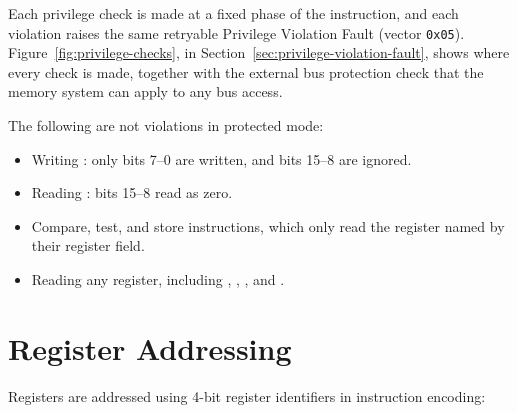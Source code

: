 Each privilege check is made at a fixed phase of the instruction, and each violation raises the same retryable
Privilege Violation Fault (vector \texttt{0x05}). Figure~\ref{fig:privilege-checks}, in
Section~\ref{sec:privilege-violation-fault}, shows where every check is made, together with the external bus protection
check that the memory system can apply to any bus access.

The following are not violations in protected mode:
\begin{itemize}
	\item Writing : only bits 7--0 are written, and bits 15--8 are ignored.
	\item Reading : bits 15--8 read as zero.
	\item Compare, test, and store instructions, which only read the register named by their register field.
	\item Reading any register, including , , , and .
\end{itemize}

\section{Register Addressing}

Registers are addressed using 4-bit register identifiers in instruction encoding:

